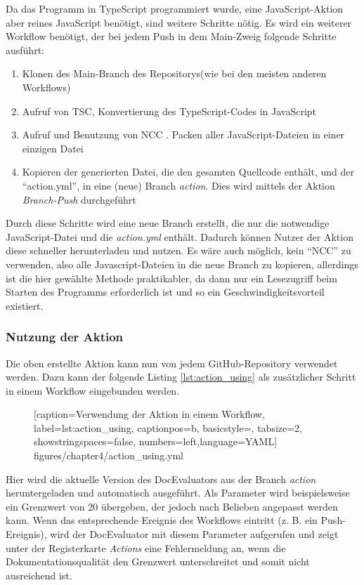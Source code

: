 \bigskip
Da das Programm in TypeScript programmiert wurde, eine JavaScript-Aktion aber reines JavaScript benötigt, sind weitere Schritte nötig. Es wird ein weiterer Workflow benötigt, der bei jedem Push in dem Main-Zweig folgende Schritte ausführt:
\begin{enumerate}
    \item Klonen des Main-Branch des Repositorys(wie bei den meisten anderen Workflows)
    \item Aufruf von TSC, Konvertierung des TypeScript-Codes in JavaScript
    \item Aufruf und Benutzung von NCC       \cite{ncc}. Packen aller JavaScript-Dateien in einer einzigen Datei
    \item Kopieren der generierten Datei, die den gesamten Quellcode enthält, und der \enquote{action.yml}, in eine (neue) Branch \textit{action}. Dies wird mittels der Aktion \textit{Branch-Push} \cite{Branch-Push} durchgeführt
\end{enumerate}
Durch diese Schritte wird eine neue Branch erstellt, die nur die notwendige JavaScript-Datei und die \textit{action.yml} enthält. Dadurch können Nutzer der Aktion diese schneller herunterladen und nutzen. Es wäre auch möglich, kein \enquote{NCC} zu verwenden, also alle Javascript-Dateien in die neue Branch zu kopieren, allerdings ist die hier gewählte Methode praktikabler, da dann nur ein Lesezugriff beim Starten des Programms erforderlich ist und so ein Geschwindigkeitsvorteil existiert. 

\subsubsection{Nutzung der Aktion}

Die oben erstellte Aktion kann nun von jedem GitHub-Repository verwendet werden. Dazu kann der folgende Listing \ref{lst:action_using} als zusätzlicher Schritt in einem Workflow eingebunden werden. 
\begin{figure} [htbp]

[caption={Verwendung der Aktion in einem Workflow},
label={lst:action_using},
captionpos=b, basicstyle=\footnotesize, tabsize=2, showstringspaces=false,  numbers=left,language=YAML]
{figures/chapter4/action_using.yml}
\end{figure}

Hier wird die aktuelle Version des DocEvaluators aus der Branch \textit{action} heruntergeladen und automatisch ausgeführt. Als Parameter wird beispielsweise ein Grenzwert von 20 übergeben, der jedoch nach Belieben angepasst werden kann. Wenn das entsprechende Ereignis des Workflows eintritt (z. B. ein Push-Ereignis), wird der DocEvaluator mit diesem Parameter aufgerufen und zeigt unter der Registerkarte \textit{Actions} eine Fehlermeldung an, wenn die Dokumentationsqualität den Grenzwert unterschreitet und somit nicht ausreichend ist.
\begin{comment}
Das Tool \textit{create\_conf}, das im Hauptverzeichnis im GitHub-Repository liegt, kann ein Workflow erstellen, indem \textit{node create\_conf.js --out PATH --type yaml} aufgerufen wird. Dieses kleine Hilfstool erzeugt dann ein beispielhafter Workflow mit allen Eingaben in dem angegebenen Pfad, um es leicht in GitHub einzubinden.
\end{comment}
